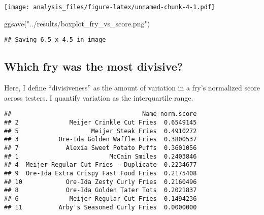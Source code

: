 \documentclass[
]{article}
\newenvironment{Shaded}{\begin{snugshade}}{\end{snugshade}}
\newcommand{\FunctionTok}[1]{\textcolor[rgb]{0.00,0.00,0.00}{#1}}
\newcommand{\NormalTok}[1]{#1}
\newcommand{\OtherTok}[1]{\textcolor[rgb]{0.56,0.35,0.01}{#1}}
\newcommand{\SpecialCharTok}[1]{\textcolor[rgb]{0.00,0.00,0.00}{#1}}
\newcommand{\StringTok}[1]{\textcolor[rgb]{0.31,0.60,0.02}{#1}}
\begin{document}
\texttt{[image: analysis\_files/figure-latex/unnamed-chunk-4-1.pdf]}

\begin{Shaded}
\begin{Highlighting}[]
\FunctionTok{ggsave}\NormalTok{(}\StringTok{"../results/boxplot\_fry\_vs\_score.png"}\NormalTok{)}
\end{Highlighting}
\end{Shaded}

\begin{verbatim}
## Saving 6.5 x 4.5 in image
\end{verbatim}

\hypertarget{which-fry-was-the-most-divisive}{%
\subsection{Which fry was the most
divisive?}\label{which-fry-was-the-most-divisive}}

Here, I define ``divisiveness'' as the amount of variation in a fry's
normalized score across testers. I quantify variation as the
interquartile range.

\begin{Shaded}
\end{Shaded}

\begin{verbatim}
##                                    Name norm.score
## 2              Meijer Crinkle Cut Fries  0.6549145
## 5                    Meijer Steak Fries  0.4910272
## 3           Ore-Ida Golden Waffle Fries  0.3800537
## 7             Alexia Sweet Potato Puffs  0.3601056
## 1                         McCain Smiles  0.2403846
## 4  Meijer Regular Cut Fries - Duplicate  0.2234677
## 9  Ore-Ida Extra Crispy Fast Food Fries  0.2175408
## 10            Ore-Ida Zesty Curly Fries  0.2160496
## 8             Ore-Ida Golden Tater Tots  0.2021837
## 6              Meijer Regular Cut Fries  0.1494236
## 11          Arby's Seasoned Curly Fries  0.0000000
\end{verbatim}
\end{document}
